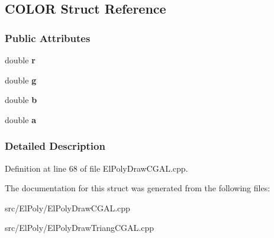 \hypertarget{structCOLOR}{\subsection{\-C\-O\-L\-O\-R \-Struct \-Reference}
\label{structCOLOR}
}
\subsubsection*{\-Public \-Attributes}
\begin{DoxyCompactItemize}
\item 
\hypertarget{structCOLOR_a880a49112fedae68e714341a9a082fb6}{double {\bfseries r}}\label{structCOLOR_a880a49112fedae68e714341a9a082fb6}

\item 
\hypertarget{structCOLOR_ab30c765b9be1b7776c97c899a12a66bb}{double {\bfseries g}}\label{structCOLOR_ab30c765b9be1b7776c97c899a12a66bb}

\item 
\hypertarget{structCOLOR_a1510a66dacf9cf3586de5fc89ae2a073}{double {\bfseries b}}\label{structCOLOR_a1510a66dacf9cf3586de5fc89ae2a073}

\item 
\hypertarget{structCOLOR_a1031d0e0a97a340abfe0a6ab9e831045}{double {\bfseries a}}\label{structCOLOR_a1031d0e0a97a340abfe0a6ab9e831045}

\end{DoxyCompactItemize}


\subsubsection{\-Detailed \-Description}


\-Definition at line 68 of file \-El\-Poly\-Draw\-C\-G\-A\-L.\-cpp.



\-The documentation for this struct was generated from the following files\-:\begin{DoxyCompactItemize}
\item 
src/\-El\-Poly/\-El\-Poly\-Draw\-C\-G\-A\-L.\-cpp\item 
src/\-El\-Poly/\-El\-Poly\-Draw\-Triang\-C\-G\-A\-L.\-cpp\end{DoxyCompactItemize}
